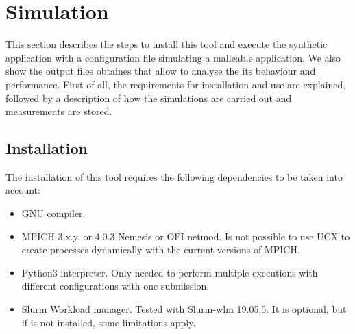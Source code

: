 \section{Simulation}
This section describes the steps to install this tool and execute the synthetic application with a configuration file simulating a malleable application. We also show the output files obtaines that allow to analyse the its behaviour and performance. First of all, the requirements for installation and use are explained, followed by a description of how the simulations are carried out and measurements are stored. 

\subsection{Installation}
The installation of this tool requires the following dependencies to be taken into account:
\begin{itemize}
    \item GNU compiler.
    \item MPICH 3.x.y. or 4.0.3 Nemesis or OFI netmod. Is not possible to use UCX to create processes dynamically with the current versions of MPICH.
    \item Python3 interpreter. Only needed to perform multiple executions with different configurations with one submission.
    \item Slurm Workload manager. Tested with Slurm-wlm 19.05.5. It is optional, but if is not installed, some limitations apply.
\end{itemize}

